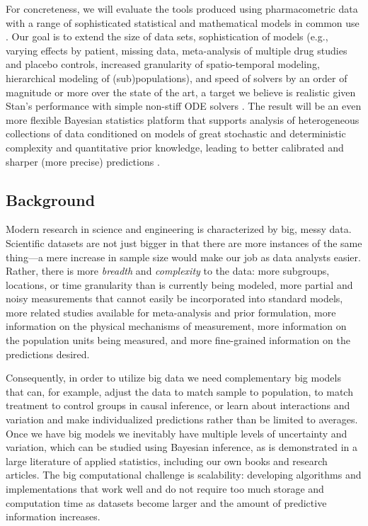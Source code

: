 \documentclass[11pt]{nih2016}
\begin{document}
For concreteness, we will evaluate the tools produced using
pharmacometric data with a range of sophisticated statistical and
mathematical models in common use \citep[e.g.,][]{ette-williams:2007,
  schmidt-derendorf:2014}. Our goal is to extend the size of data
sets, sophistication of models (e.g., varying effects by patient,
missing data, meta-analysis of multiple drug studies and placebo
controls, increased granularity of spatio-temporal modeling,
hierarchical modeling of (sub)populations), and speed of solvers by an
order of magnitude or more over the state of the art, a target we
believe is realistic given Stan's performance with simple non-stiff
ODE solvers \cite{weber-et-al:2014}.  The result will be an even more
flexible Bayesian statistics platform that supports analysis of
heterogeneous collections of data conditioned on models of great
stochastic and deterministic complexity and quantitative prior
knowledge, leading to better calibrated and sharper (more precise)
predictions \citep[see, e.g.,][]{gneiting-et-al:2007}.

\subsection{Background}

Modern research in science and engineering is characterized by big,
messy data. Scientific datasets are not just bigger in that there are
more instances of the same thing---a mere increase in sample size
would make our job as data analysts easier. Rather, there is more {\em
  breadth} and {\em complexity} to the data: more subgroups,
locations, or time granularity than is currently being modeled, more
partial and noisy measurements that cannot easily be incorporated into
standard models, more related studies available for meta-analysis and
prior formulation, more information on the physical mechanisms of
measurement, more information on the population units being measured,
and more fine-grained information on the predictions desired.

Consequently, in order to utilize big data we need complementary big
models that can, for example, adjust the data to match sample to
population, to match treatment to control groups in causal inference,
or learn about interactions and variation and make individualized
predictions rather than be limited to averages.  Once we have big
models we inevitably have multiple levels of uncertainty and
variation, which can be studied using Bayesian inference, as is
demonstrated in a large literature of applied statistics, including
our own books and research articles. The big computational challenge
is scalability: developing algorithms and implementations that work
well and do not require too much storage and computation time as
datasets become larger and the amount of predictive information
increases.
\end{document}
